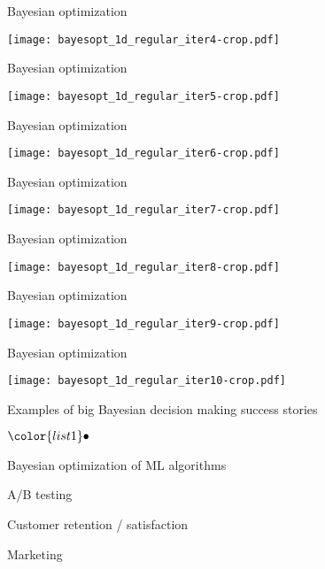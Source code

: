 \documentclass[t]{beamer}
\newenvironment{list1}{
   \begin{list}{$\color{list1}\bullet$}{\itemsep=6pt}}{
  \end{list}}
\begin{document}
\begin{frame}
  
  {\Large\color{navyblue} Bayesian optimization}

    \texttt{[image: bayesopt\_1d\_regular\_iter4-crop.pdf]}

\end{frame}
\begin{frame}
  
  {\Large\color{navyblue} Bayesian optimization}

    \texttt{[image: bayesopt\_1d\_regular\_iter5-crop.pdf]}

\end{frame}
\begin{frame}
  
  {\Large\color{navyblue} Bayesian optimization}

    \texttt{[image: bayesopt\_1d\_regular\_iter6-crop.pdf]}

\end{frame}
\begin{frame}
  
  {\Large\color{navyblue} Bayesian optimization}

    \texttt{[image: bayesopt\_1d\_regular\_iter7-crop.pdf]}

\end{frame}
\begin{frame}
  
  {\Large\color{navyblue} Bayesian optimization}

    \texttt{[image: bayesopt\_1d\_regular\_iter8-crop.pdf]}

\end{frame}
\begin{frame}
  
  {\Large\color{navyblue} Bayesian optimization}

    \texttt{[image: bayesopt\_1d\_regular\_iter9-crop.pdf]}

\end{frame}
\begin{frame}
  
  {\Large\color{navyblue} Bayesian optimization}

    \texttt{[image: bayesopt\_1d\_regular\_iter10-crop.pdf]}

\end{frame}

\begin{frame}{Examples of big Bayesian decision making success stories}

  \begin{list1}
    \item Bayesian optimization of ML algorithms
    \item A/B testing
    \item Customer retention / satisfaction
    \item Marketing
  \end{list1}
  
\end{frame}
\end{document}
